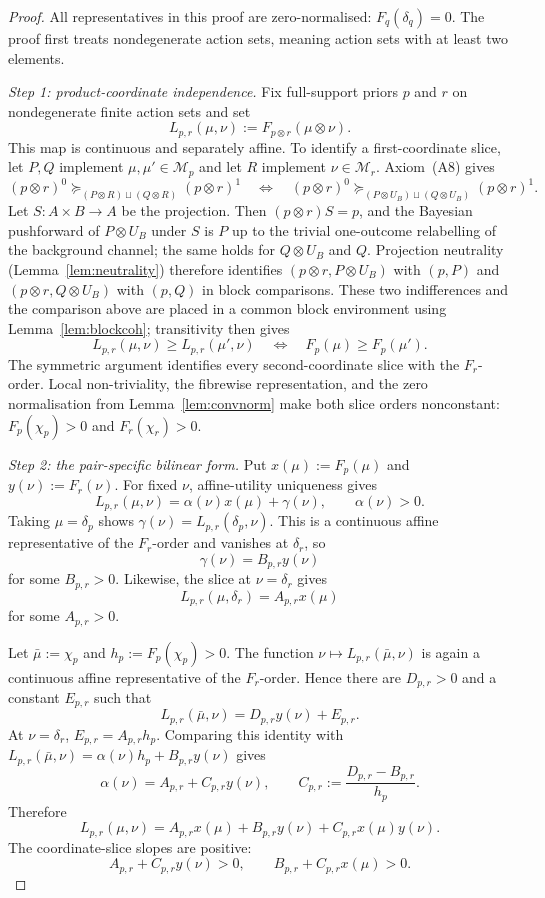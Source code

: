 \documentclass[11pt,a4paper]{article}
\theoremstyle{definition}
\newcommand{\1}{\mathbf 1}
\begin{document}
\begin{proof}
All representatives in this proof are zero-normalised: $F_q(\delta_q)=0$.  The proof first treats nondegenerate action
sets, meaning action sets with at least two elements.

\emph{Step 1: product-coordinate independence.}
Fix full-support priors $p$ and $r$ on nondegenerate finite action sets and set
\[
L_{p,r}(\mu,\nu):=F_{p\otimes r}(\mu\otimes\nu).
\]
This map is continuous and separately affine.  To identify a first-coordinate slice, let $P,Q$ implement
$\mu,\mu'\in\mathcal M_p$ and let $R$ implement $\nu\in\mathcal M_r$.  Axiom~\textup{(A8)} gives
\[
(p\otimes r)^0\succeq_{(P\otimes R)\sqcup(Q\otimes R)}(p\otimes r)^1
\quad\Longleftrightarrow\quad
(p\otimes r)^0\succeq_{(P\otimes U_B)\sqcup(Q\otimes U_B)}(p\otimes r)^1.
\]
Let $S:A\times B\to A$ be the projection.  Then $(p\otimes r)S=p$, and the Bayesian pushforward of
$P\otimes U_B$ under $S$ is $P$ up to the trivial one-outcome relabelling of the background channel; the same holds for
$Q\otimes U_B$ and $Q$.  Projection neutrality (Lemma~\ref{lem:neutrality}) therefore identifies
$(p\otimes r,P\otimes U_B)$ with $(p,P)$ and $(p\otimes r,Q\otimes U_B)$ with $(p,Q)$ in block comparisons.  These two
indifferences and the comparison above are placed in a common block environment using Lemma~\ref{lem:blockcoh};
transitivity then gives
\[
L_{p,r}(\mu,\nu)\ge L_{p,r}(\mu',\nu)
\quad\Longleftrightarrow\quad
F_p(\mu)\ge F_p(\mu').
\]
The symmetric argument identifies every second-coordinate slice with the $F_r$-order.  Local non-triviality, the
fibrewise representation, and the zero normalisation from Lemma~\ref{lem:convnorm} make both slice orders nonconstant:
$F_p(\chi_p)>0$ and $F_r(\chi_r)>0$.

\emph{Step 2: the pair-specific bilinear form.}
Put $x(\mu):=F_p(\mu)$ and $y(\nu):=F_r(\nu)$.  For fixed $\nu$, affine-utility uniqueness gives
\[
L_{p,r}(\mu,\nu)=\alpha(\nu)x(\mu)+\gamma(\nu),
\qquad \alpha(\nu)>0.
\]
Taking $\mu=\delta_p$ shows $\gamma(\nu)=L_{p,r}(\delta_p,\nu)$.  This is a continuous affine representative of the
$F_r$-order and vanishes at $\delta_r$, so
\[
\gamma(\nu)=B_{p,r}y(\nu)
\]
for some $B_{p,r}>0$.  Likewise, the slice at $\nu=\delta_r$ gives
\[
L_{p,r}(\mu,\delta_r)=A_{p,r}x(\mu)
\]
for some $A_{p,r}>0$.

Let $\bar\mu:=\chi_p$ and $h_p:=F_p(\chi_p)>0$.  The function
$\nu\mapsto L_{p,r}(\bar\mu,\nu)$ is again a continuous affine representative of the $F_r$-order.  Hence there are
$D_{p,r}>0$ and a constant $E_{p,r}$ such that
\[
L_{p,r}(\bar\mu,\nu)=D_{p,r}y(\nu)+E_{p,r}.
\]
At $\nu=\delta_r$, $E_{p,r}=A_{p,r}h_p$.  Comparing this identity with
$L_{p,r}(\bar\mu,\nu)=\alpha(\nu)h_p+B_{p,r}y(\nu)$ gives
\[
\alpha(\nu)=A_{p,r}+C_{p,r}y(\nu),
\qquad
C_{p,r}:=\frac{D_{p,r}-B_{p,r}}{h_p}.
\]
Therefore
\begin{equation}
L_{p,r}(\mu,\nu)
=A_{p,r}x(\mu)+B_{p,r}y(\nu)+C_{p,r}x(\mu)y(\nu).
\tag{BIL}\label{eq:pairbilinear}
\end{equation}
The coordinate-slice slopes are positive:
\[
A_{p,r}+C_{p,r}y(\nu)>0,
\qquad
B_{p,r}+C_{p,r}x(\mu)>0.
\]


\end{proof}
\end{document}
